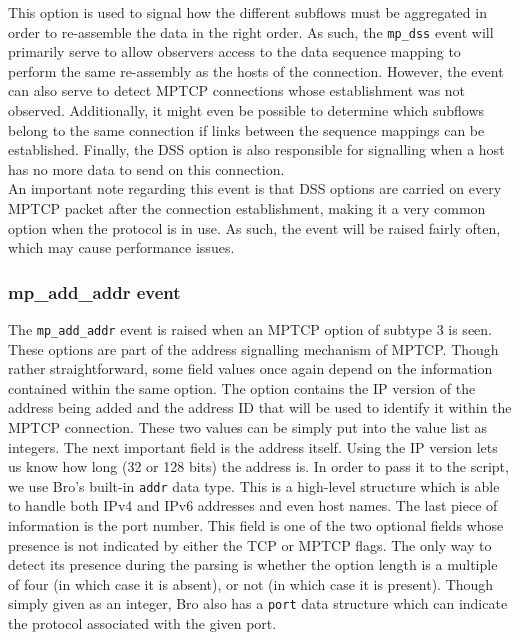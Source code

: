 \documentclass[12pt, a4paper, oneside]{article} %
\begin{document}
This option is used to signal how the different subflows must be aggregated in order to re-assemble the data in the right order. As such, the \texttt{mp\_dss} event will primarily serve to allow observers access to the data sequence mapping to perform the same re-assembly as the hosts of the connection. However, the event can also serve to detect MPTCP connections whose establishment was not observed. Additionally, it might even be possible to determine which subflows belong to the same connection if links between the sequence mappings can be established. Finally, the DSS option is also responsible for signalling when a host has no more data to send on this connection.\\

An important note regarding this event is that DSS options are carried on every MPTCP packet after the connection establishment, making it a very common option when the protocol is in use. As such, the event will be raised fairly often, which may cause performance issues.

\subsubsection{mp\_add\_addr event}
The \texttt{mp\_add\_addr} event is raised when an MPTCP option of subtype 3 is seen. These options are part of the address signalling mechanism of MPTCP. Though rather straightforward, some field values once again depend on the information contained within the same option. The option contains the IP version of the address being added and the address ID that will be used to identify it within the MPTCP connection. These two values can be simply put into the value list as integers. The next important field is the address itself. Using the IP version lets us know how long (32 or 128 bits) the address is. In order to pass it to the script, we use Bro's built-in \texttt{addr} data type. This is a high-level structure which is able to handle both IPv4 and IPv6 addresses and even host names. The last piece of information is the port number. This field is one of the two optional fields whose presence is not indicated by either the TCP or MPTCP flags. The only way to detect its presence during the parsing is whether the option length is a multiple of four (in which case it is absent), or not (in which case it is present). Though simply given as an integer, Bro also has a  \texttt{port} data structure which can indicate the protocol associated with the given port. \\
\end{document}
